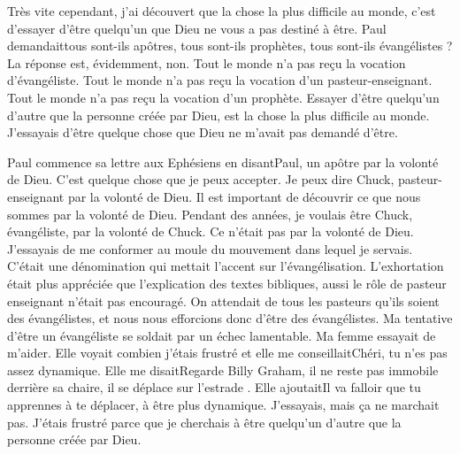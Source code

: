 Très vite cependant, j'ai découvert que la chose la plus difficile au monde, c’est d’essayer d’être quelqu'un que Dieu
ne vous a pas destiné à être. Paul demandait\frcolon tous sont-ils apôtres, tous sont-ils prophètes, tous sont-ils évangélistes
? La réponse est, évidemment, \og non\fg{}. Tout le monde n’a pas reçu la vocation d’évangéliste. Tout le monde n’a pas
reçu la vocation d’un pasteur-enseignant. Tout le monde n’a pas reçu la vocation d’un prophète. Essayer d’être
quelqu'un d'autre que la personne créée par Dieu, est la chose la plus difficile au monde. J’essayais d’être quelque
chose que Dieu ne m’avait pas demandé d'être.

Paul commence sa lettre aux Ephésiens en disant\frcolon\og Paul, un apôtre par la volonté de Dieu\fg{}. C'est quelque chose que
je peux accepter. Je peux dire
\og Chuck, pasteur-enseignant par la volonté de Dieu\fg{}. Il est important de découvrir ce que nous sommes par la volonté
de Dieu. Pendant des années, je voulais être \og Chuck, évangéliste, par la volonté de Chuck\fg{}. Ce n’était pas par la
volonté de Dieu. J’essayais de me conformer au moule du mouvement dans lequel je servais. C’était une
dénomination qui mettait l'accent sur l’évangélisation. L’exhortation était plus appréciée que l’explication des textes
bibliques, aussi le rôle de pasteur enseignant n'était pas encouragé. On attendait de tous les pasteurs qu'ils soient des
évangélistes, et nous nous efforcions donc d’être des évangélistes. Ma tentative d'être un évangéliste se soldait par
un échec lamentable. Ma femme essayait de m’aider. Elle voyait combien j'étais frustré et elle me conseillait\frcolon\og Chéri,
tu n’es pas assez dynamique\fg{}. Elle me disait\frcolon\og Regarde Billy Graham, il ne reste pas immobile derrière sa chaire, il se
déplace sur l'estrade \fg{}. Elle ajoutait\frcolon\og Il va falloir que tu apprennes à te déplacer, à être plus dynamique\fg{}. J’essayais,
mais ça ne marchait pas. J’étais frustré parce que je cherchais à être quelqu'un d'autre que la personne créée par
Dieu.

